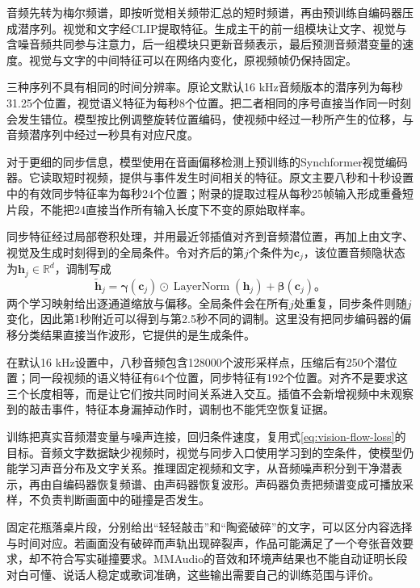 音频先转为梅尔频谱，即按听觉相关频带汇总的短时频谱，再由预训练自编码器压成潜序列。视觉和文字经CLIP提取特征。生成主干的前一组模块让文字、视觉与含噪音频共同参与注意力，后一组模块只更新音频表示，最后预测音频潜变量的速度。视觉与文字的中间特征可以在网络内变化，原视频帧仍保持固定。

三种序列不具有相同的时间分辨率。原论文默认16 kHz音频版本的潜序列为每秒31.25个位置，视觉语义特征为每秒8个位置。把二者相同的序号直接当作同一时刻会发生错位。模型按比例调整旋转位置编码，使视频中经过一秒所产生的位移，与音频潜序列中经过一秒具有对应尺度。

对于更细的同步信息，模型使用在音画偏移检测上预训练的Synchformer视觉编码器。它读取短时视频，提供与事件发生时间相关的特征。原文主要八秒和十秒设置中的有效同步特征率为每秒24个位置；附录的提取过程从每秒25帧输入形成重叠短片段，不能把24直接当作所有输入长度下不变的原始取样率。

同步特征经过局部卷积处理，并用最近邻插值对齐到音频潜位置，再加上由文字、视觉及生成时刻得到的全局条件。令对齐后的第$j$个条件为$\bm c_j$，该位置音频隐状态为$\bm h_j\in\mathbb R^d$，调制写成
\begin{equation}
  \widetilde{\bm h}_j
  =\bm\gamma(\bm c_j)\odot
     \operatorname{LayerNorm}(\bm h_j)
    +\bm\beta(\bm c_j)\text{。}
  \label{eq:vision-audio-sync-modulation}
\end{equation}
两个学习映射给出逐通道缩放与偏移。全局条件会在所有$j$处重复，同步条件则随$j$变化，因此第1秒附近可以得到与第2.5秒不同的调制。这里没有把同步编码器的偏移分类结果直接当作波形，它提供的是生成条件。

在默认16 kHz设置中，八秒音频包含128000个波形采样点，压缩后有250个潜位置；同一段视频的语义特征有64个位置，同步特征有192个位置。对齐不是要求这三个长度相等，而是让它们按共同时间关系进入交互。插值不会新增视频中未观察到的敲击事件，特征本身漏掉动作时，调制也不能凭空恢复证据。

训练把真实音频潜变量与噪声连接，回归条件速度，复用式\eqref{eq:vision-flow-loss}的目标。音频文字数据缺少视频时，视觉与同步入口使用学习到的空条件，使模型仍能学习声音分布及文字关系。推理固定视频和文字，从音频噪声积分到干净潜表示，再由自编码器恢复频谱、由声码器恢复波形。声码器负责把频谱变成可播放采样，不负责判断画面中的碰撞是否发生。

固定花瓶落桌片段，分别给出“轻轻敲击”和“陶瓷破碎”的文字，可以区分内容选择与时间对应。若画面没有破碎而声轨出现碎裂声，作品可能满足了一个夸张音效要求，却不符合写实碰撞要求。MMAudio的音效和环境声结果也不能自动证明长段对白可懂、说话人稳定或歌词准确，这些输出需要自己的训练范围与评价。

